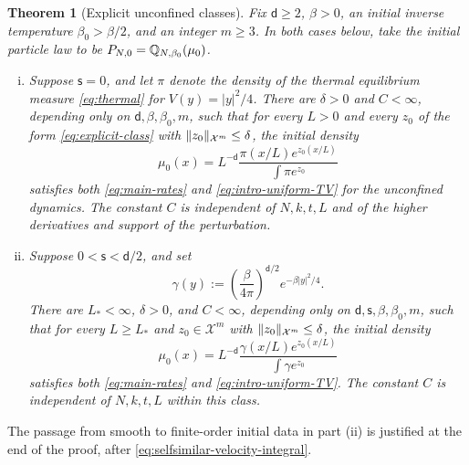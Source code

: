 \documentclass[11pt,reqno]{amsart}
\numberwithin{equation}{section}
\theoremstyle{plain}
\newtheorem{thm}{Theorem}[section]
\theoremstyle{remark}
\DeclarePairedDelimiter{\norm}{\lVert}{\rVert}
\renewcommand{\d}{\mathsf{d}}\newcommand{\s}{\mathsf{s}}
\newcommand{\Xspace}{\mathcal X}
\begin{document}
\begin{thm}[Explicit unconfined classes]\label{thm:unconfined}
Fix $\d\ge2$, $\beta>0$, an initial inverse temperature $\beta_0>\beta/2$, and an integer $m\ge3$. In both cases below, take the initial particle law to be $P_{N,0}=\mathbb Q_{N,\beta_0}(\mu_0)$.
\begin{enumerate}[(i)]
\item Suppose $\s=0$, and let $\pi$ denote the density of the thermal equilibrium measure \eqref{eq:thermal} for $V(y)=|y|^2/4$. There are $\delta>0$ and $C<\infty$, depending only on $\d,\beta,\beta_0,m$, such that for every $L>0$ and every $z_0$ of the form \eqref{eq:explicit-class} with $\norm{z_0}_{\Xspace^m}\le\delta$, the initial density
\begin{equation}\label{eq:unconfined-log-data}
 \mu_0(x)=L^{-\d}\frac{\pi(x/L)e^{z_0(x/L)}}{\int\pi e^{z_0}}
\end{equation}
satisfies both \eqref{eq:main-rates} and \eqref{eq:intro-uniform-TV} for the unconfined dynamics. The constant $C$ is independent of $N,k,t,L$ and of the higher derivatives and support of the perturbation.
\item Suppose $0<\s<\d/2$, and set
\begin{equation}\label{eq:selfsimilar-gaussian}
 \gamma(y):=\left(\frac\beta{4\pi}\right)^{\d/2}e^{-\beta|y|^2/4}.
\end{equation}
There are $L_*<\infty$, $\delta>0$, and $C<\infty$, depending only on $\d,\s,\beta,\beta_0,m$, such that for every $L\ge L_*$ and $z_0\in\Xspace^m$ with $\norm{z_0}_{\Xspace^m}\le\delta$, the initial density
\begin{equation}\label{eq:unconfined-riesz-data}
 \mu_0(x)=L^{-\d}\frac{\gamma(x/L)e^{z_0(x/L)}}{\int\gamma e^{z_0}}
\end{equation}
satisfies both \eqref{eq:main-rates} and \eqref{eq:intro-uniform-TV}. The constant $C$ is independent of $N,k,t,L$ within this class.
\end{enumerate}
\end{thm}

The passage from smooth to finite-order initial data in part \textup{(ii)} is justified at the end of the proof, after \eqref{eq:selfsimilar-velocity-integral}.
\end{document}
